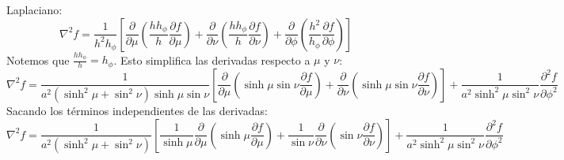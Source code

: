 \documentclass[11pt,spanish]{article}
\begin{document}
\begin{itemize}
Laplaciano:
$$
\nabla^2 f = \frac{1}{h^2 h_\phi} \left[ \frac{\partial}{\partial \mu}\left( \frac{h h_\phi}{h} \frac{\partial f}{\partial \mu} \right) + \frac{\partial}{\partial \nu}\left( \frac{h h_\phi}{h} \frac{\partial f}{\partial \nu} \right) + \frac{\partial}{\partial \phi}\left( \frac{h^2}{h_\phi} \frac{\partial f}{\partial \phi} \right) \right]
$$
Notemos que $\frac{h h_\phi}{h} = h_\phi$. Esto simplifica las derivadas respecto a $\mu$ y $\nu$:
$$
\nabla^2 f = \frac{1}{a^2 (\sinh^2\mu + \sin^2\nu) \sinh\mu \sin\nu} \left[ \frac{\partial}{\partial \mu}\left( \sinh\mu \sin\nu \frac{\partial f}{\partial \mu} \right) + \frac{\partial}{\partial \nu}\left( \sinh\mu \sin\nu \frac{\partial f}{\partial \nu} \right) \right] + \frac{1}{a^2 \sinh^2\mu \sin^2\nu} \frac{\partial^2 f}{\partial \phi^2}
$$
Sacando los términos independientes de las derivadas:
$$
\nabla^2 f = \frac{1}{a^2 (\sinh^2\mu + \sin^2\nu)} \left[ \frac{1}{\sinh\mu} \frac{\partial}{\partial \mu}\left( \sinh\mu \frac{\partial f}{\partial \mu} \right) + \frac{1}{\sin\nu} \frac{\partial}{\partial \nu}\left( \sin\nu \frac{\partial f}{\partial \nu} \right) \right] + \frac{1}{a^2 \sinh^2\mu \sin^2\nu} \frac{\partial^2 f}{\partial \phi^2}
$$
\end{itemize}
\end{document}
